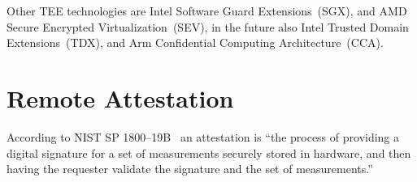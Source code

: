 Other \ac{TEE} technologies are Intel Software Guard Extensions~(SGX), and AMD Secure Encrypted Virtualization~(SEV), in the future also Intel Trusted Domain Extensions~(TDX), and Arm Confidential Computing Architecture~(CCA).










\section{Remote Attestation}


According to NIST SP 1800--19B~\cite{Bartock2022} an attestation is ``the process of providing a digital signature for a set of measurements securely stored in hardware, and then having the requester validate the signature and the set of measurements.''




